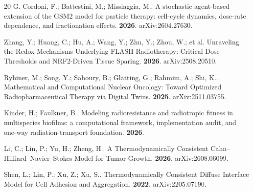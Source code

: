 \documentclass[11pt]{article}
\begin{document}
\begin{thebibliography}{20}
 G. Cordoni, F.; Battestini, M.; Missiaggia, M.. A stochastic agent-based extension of the GSM2 model for particle therapy: cell-cycle dynamics, dose-rate dependence, and fractionation effects. \textbf{2026}. arXiv:2604.27630.

 Zhang, Y.; Huang, C.; Hu, A.; Wang, Y.; Zhu, Y.; Zhou, W.; et al. Unraveling the Redox Mechanisms Underlying FLASH Radiotherapy: Critical Dose Thresholds and NRF2-Driven Tissue Sparing. \textbf{2026}. arXiv:2508.20510.

 Ryhiner, M.; Song, Y.; Saboury, B.; Glatting, G.; Rahmim, A.; Shi, K.. Mathematical and Computational Nuclear Oncology: Toward Optimized Radiopharmaceutical Therapy via Digital Twins. \textbf{2025}. arXiv:2511.03755.

 Kinder, H.; Faulkner, B.. Modeling radioresistance and radiotropic fitness in multispecies biofilms: a computational framework, implementation audit, and one-way radiation-transport foundation. \textbf{2026}.

 Li, C.; Lin, P.; Yu, H.; Zheng, H.. A Thermodynamically Consistent Cahn--Hilliard--Navier--Stokes Model for Tumor Growth. \textbf{2026}. arXiv:2608.06099.

 Shen, L.; Lin, P.; Xu, Z.; Xu, S.. Thermodynamically Consistent Diffuse Interface Model for Cell Adhesion and Aggregation. \textbf{2022}. arXiv:2205.07190.

\end{thebibliography}
\end{document}
